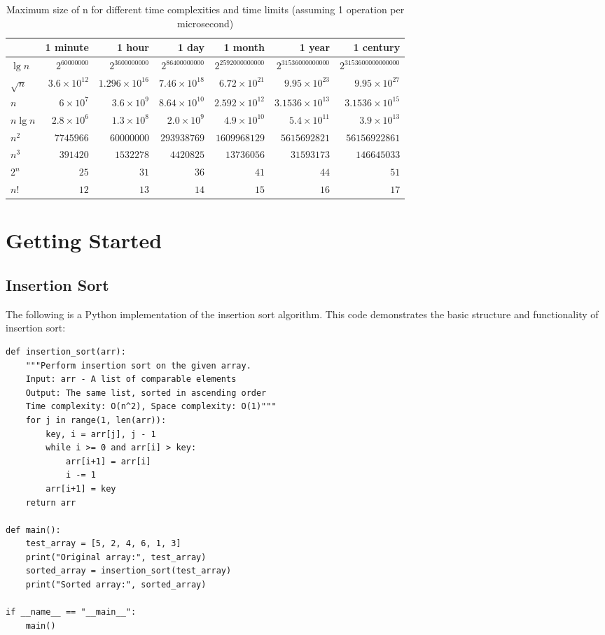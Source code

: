 \documentclass{book}
\begin{document}
\begin{table}[h]
    \centering
    \begin{tabular}{|l|r|r|r|r|r|r|}
        \hline
        & 1 minute & 1 hour & 1 day & 1 month & 1 year & 1 century \\
        \hline
        $\lg n$     & $2^{60000000}$ & $2^{3600000000}$ & $2^{86400000000}$ & $2^{2592000000000}$ & $2^{31536000000000}$ & $2^{3153600000000000}$ \\
        $\sqrt{n}$  & $3.6 \times 10^{12}$ & $1.296 \times 10^{16}$ & $7.46 \times 10^{18}$ & $6.72 \times 10^{21}$ & $9.95 \times 10^{23}$ & $9.95 \times 10^{27}$ \\
        $n$         & $6 \times 10^7$ & $3.6 \times 10^9$ & $8.64 \times 10^{10}$ & $2.592 \times 10^{12}$ & $3.1536 \times 10^{13}$ & $3.1536 \times 10^{15}$ \\
        $n \lg n$   & $2.8 \times 10^6$ & $1.3 \times 10^8$ & $2.0 \times 10^9$ & $4.9 \times 10^{10}$ & $5.4 \times 10^{11}$ & $3.9 \times 10^{13}$ \\
        $n^2$       & $7745966$ & $60000000$ & $293938769$ & $1609968129$ & $5615692821$ & $56156922861$ \\
        $n^3$       & $391420$ & $1532278$ & $4420825$ & $13736056$ & $31593173$ & $146645033$ \\
        $2^n$       & $25$ & $31$ & $36$ & $41$ & $44$ & $51$ \\
        $n!$        & $12$ & $13$ & $14$ & $15$ & $16$ & $17$ \\
        \hline
    \end{tabular}
    \caption{Maximum size of n for different time complexities and time limits (assuming 1 operation per microsecond)}
    \label{tab:time_complexity}
\end{table}

\chapter{Getting Started}

\section{Insertion Sort}

The following is a Python implementation of the insertion sort algorithm. This code demonstrates the basic structure and functionality of insertion sort:

\begin{verbatim}
def insertion_sort(arr):
    """Perform insertion sort on the given array.
    Input: arr - A list of comparable elements
    Output: The same list, sorted in ascending order
    Time complexity: O(n^2), Space complexity: O(1)"""
    for j in range(1, len(arr)):
        key, i = arr[j], j - 1
        while i >= 0 and arr[i] > key:
            arr[i+1] = arr[i]
            i -= 1
        arr[i+1] = key
    return arr

def main():
    test_array = [5, 2, 4, 6, 1, 3]
    print("Original array:", test_array)
    sorted_array = insertion_sort(test_array)
    print("Sorted array:", sorted_array)

if __name__ == "__main__":
    main()
\end{verbatim}
\end{document}
